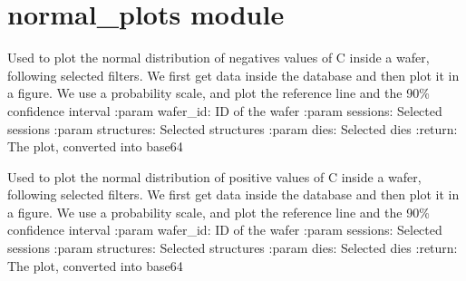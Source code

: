 \documentclass[letterpaper,10pt,english]{sphinxmanual}
\begin{document}
\sphinxstepscope


\section{normal\_plots module}
\label{\detokenize{normal_plots:module-normal_plots}}\label{\detokenize{normal_plots:normal-plots-module}}\label{\detokenize{normal_plots::doc}}

\begin{fulllineitems}
\label{\detokenize{normal_plots:normal_plots.C_normal_distrib_neg}}
\pysigstartsignatures
{}
\pysigstopsignatures
\sphinxAtStartPar
Used to plot the normal distribution of negatives values of C inside a wafer, following selected filters.
We first get data inside the database and then plot it in a figure. We use a probability scale, and plot the reference line and the 90\% confidence interval
:param wafer\_id: ID of the wafer
:param sessions: Selected sessions
:param structures: Selected structures
:param dies: Selected dies
:return: The plot, converted into base64

\end{fulllineitems}


\begin{fulllineitems}
\label{\detokenize{normal_plots:normal_plots.C_normal_distrib_pos}}
\pysigstartsignatures
{}
\pysigstopsignatures
\sphinxAtStartPar
Used to plot the normal distribution of positive values of C inside a wafer, following selected filters.
We first get data inside the database and then plot it in a figure. We use a probability scale, and plot the reference line and the 90\% confidence interval
:param wafer\_id: ID of the wafer
:param sessions: Selected sessions
:param structures: Selected structures
:param dies: Selected dies
:return: The plot, converted into base64

\end{fulllineitems}
\end{document}
